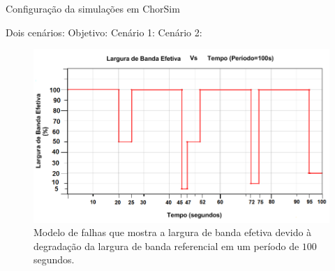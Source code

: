 \documentclass[xcolor=svgnames]{beamer}
\begin{document}
  \begin{frame}{Configuração da simulações em ChorSim}  
      
  Dois cenários:
  Objetivo: 
  Cenário 1:
  Cenário 2: 

	\begin{figure}[!h]
	    \centering
	    \includegraphics[width=.8\linewidth]{figures/failure_model.png}
	    \caption{Modelo de falhas que mostra a largura de banda efetiva devido à degradação da largura de banda referencial em um período de $100$ segundos.}
	    \label{figure:failure_model}
	\end{figure}
  \end{frame}
  
\end{document}

